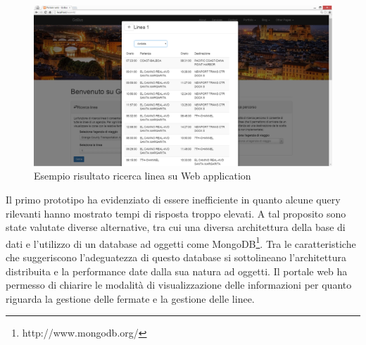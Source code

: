 \begin{figure}[tb]
\centering
\includegraphics[scale=.3]{img/20.png}
\caption{Esempio risultato ricerca linea su Web application }
\label{fig:mhs}
\end{figure} 

Il primo prototipo ha evidenziato di essere inefficiente in quanto alcune query rilevanti hanno mostrato tempi di risposta troppo elevati. A tal proposito sono state valutate diverse alternative, tra cui una diversa architettura della base di dati e l\rq utilizzo di un database ad oggetti come MongoDB\footnote{http://www.mongodb.org/ }. Tra le caratteristiche che suggeriscono l\rq adeguatezza di questo database si sottolineano l\rq architettura distribuita e la performance date dalla sua natura ad oggetti. Il portale web ha permesso di chiarire le modalit\`{a} di visualizzazione delle informazioni per quanto riguarda la gestione delle fermate e la gestione delle linee. 

